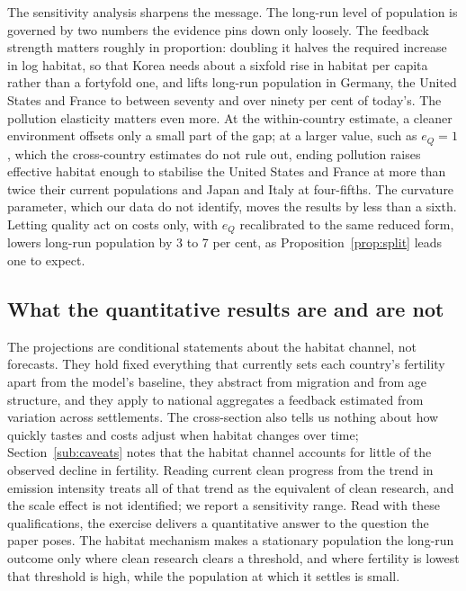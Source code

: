 \documentclass[11pt]{article}
\begin{document}
The sensitivity analysis sharpens the message. The long-run level of population is governed by two
numbers the evidence pins down only loosely. The feedback strength matters roughly in proportion: doubling
it halves the required increase in log habitat, so that Korea needs about a sixfold rise in habitat per
capita rather than a fortyfold one, and lifts long-run population in Germany, the United States and France to
between seventy and over ninety per cent of today's. The pollution elasticity matters even more. At the
within-country estimate, a cleaner environment offsets only a small part of the gap; at a larger value,
such as $e_Q=1$, which the cross-country estimates do not rule out, ending pollution raises effective habitat enough to stabilise the United States and France at
more than twice their current populations and Japan and Italy at four-fifths. The curvature parameter,
which our data do not identify, moves the results by less than a sixth. Letting quality act on costs only,
with $e_Q$ recalibrated to the same reduced form, lowers long-run population by 3 to 7 per cent, as
Proposition~\ref{prop:split} leads one to expect.

\subsection{What the quantitative results are and are not}
The projections are conditional statements about the habitat channel, not forecasts. They hold fixed
everything that currently sets each country's fertility apart from the model's baseline, they abstract
from migration and from age structure, and they apply to national aggregates a feedback estimated from
variation across settlements. The cross-section also tells us nothing about how quickly tastes and costs
adjust when habitat changes over time; Section~\ref{sub:caveats} notes that the habitat channel accounts
for little of the observed decline in fertility. Reading current clean progress from the trend in emission
intensity treats all of that trend as the equivalent of clean research, and the scale effect is not
identified; we report a sensitivity range. Read with these qualifications, the exercise delivers a quantitative answer to the question
the paper poses. The habitat mechanism makes a stationary population the long-run outcome only where
clean research clears a threshold, and where fertility is lowest that threshold is high, while the
population at which it settles is small.

\end{document}
